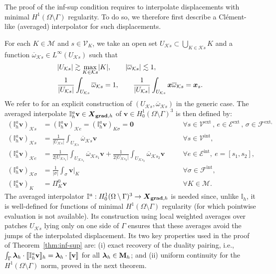 \documentclass[a4paper,11pt]{article}
\theoremstyle{definition}
\theoremstyle{remark}
\newcommand{\bvec}[1]{\boldsymbol{#1}}
\newcommand{\bo}[1]{\mathbf{#1}}
\newcommand{\bx}{\bvec{x}}
\def\ext{\text{ext}}
\def\inte{\text{int}}
\def\cE{\mathcal{E}}
\def\cF{\mathcal{F}}
\def\cK{\mathcal{K}}
\def\cM{\mathcal{M}}
\def\cV{\mathcal{V}}
\def\blambda{\boldsymbol{\lambda}}
\def\dgs{\boldsymbol{X}_{{\bf grad},h}}
\def\sjump#1{[\hskip -1.5pt[#1]\hskip -1.5pt]}
\def\O{\Omega}
\newcommand{\Ks}{{\mathcal{K}s}}
\newcommand{\Ke}{{\mathcal{K}e}}
\def\Ksig{{K\!\sigma}}
\begin{document}
The proof of the inf-sup condition requires to interpolate displacements with minimal ${H}^1(\Omega\setminus{\Gamma})$ regularity. To do so, we therefore first describe a Clément-like (averaged) interpolator for such displacements.

For each $K\in\cM$ and $s\in\cV_K$, we take an open set $U_{\cK s}\subset\bigcup_{K\in\cK s}K$ and a function $\overline{\omega}_{\cK s}\in L^\infty(U_{\cK s})$ such that 
\begin{align}
&\lvert U_{\cK s}\rvert \gtrsim \max\limits_{K\in\cK s}\lvert K\rvert,\qquad\lvert\overline{\omega}_{\cK s}\rvert\lesssim 1,\notag\\
&\frac{1}{\lvert U_{\cK s}\rvert}\int_{U_{\cK s}}\overline{\omega}_{\cK s}=1,\qquad\frac{1}{\lvert U_{\cK s}\rvert}\int_{U_{\cK s}}\bx\overline{\omega}_{\cK s}=\bx_s.\label{5.15b}
\end{align}
We refer to \cite[Appendix A]{jhr} for an explicit construction of $(U_{\cK s},\overline{\omega}_{\cK s})$ in the generic case.
The averaged interpolate $\mathbb I^{a}_h\bo{v}\in\dgs$ of $\bo{v}\in H^1_0(\O\setminus{\Gamma})^3$ is then defined by:
\begin{subequations}\label{3.44}
\begin{alignat}{2}
\left(\mathbb I^{a}_h\bo{v}\right)_{\Ks}&=\left(\mathbb I^{a}_h\bo{v}\right)_{\Ke}=\left(\mathbb I^{a}_h\bo{v}\right)_{\Ksig}=\bo{0}&&\quad\forall s\in \mathcal{V}^{\text{ext}}\,,\,e\in\cE^{\ext}\,,\,\sigma\in\cF^{\ext,} \nonumber\\
\left(\mathbb I^{a}_h\bo{v}\right)_{\Ks}&=\frac{1}{\lvert U_{\mathcal K s}\rvert}\int_{U_{\mathcal K s}}\overline{\omega}_{\mathcal Ks}\bo{v}&&\quad\forall s\in \cV^\inte,\nonumber\\
\left(\mathbb I^{a}_h\bo{v}\right)_{\Ke}&=\frac{1}{2\lvert U_{\mathcal K s_1}\rvert}\int_{U_{\mathcal K s_1}}\overline{\omega}_{\mathcal Ks_1}\bo{v}+\frac{1}{2\lvert U_{\mathcal K s_2}\rvert}\int_{U_{\mathcal K s_2}}\overline{\omega}_{\mathcal Ks_2}\bo{v}&&\quad\forall e\in\cE^\inte,~e=[s_1,s_2],\label{5.16c}\\
\left(\mathbb I^{a}_h\bo{v}\right)_{\cK\sigma}  &=\frac{1}{\lvert\sigma\rvert}\int_{\sigma}\bo{v}|_K &&\quad\forall \sigma\in\cF^\inte,\label{5.16d}\\
\left(\mathbb I^{a}_h\bo{v}\right)_K&=\Pi^0_K \bo{v}&&\quad\forall K\in\cM \nonumber.
\end{alignat}
\end{subequations}
The averaged interpolator $\mathbb I^{a} : H^1_0(\Omega \setminus \Gamma)^3 
\to \dgs$ is needed since, unlike $\mathbb{I}_{h}$, it is well-defined for  functions of minimal $H^1(\Omega \setminus \Gamma)$ regularity 
(for which pointwise evaluation is not available). Its construction using local weighted averages over patches $U_{\Ks}$ lying only on one side of $\Gamma$ ensures that these averages avoid the jumps of the interpolated displacement. Its two key properties used in the proof of Theorem~\ref{thm:inf-sup} 
are: (i) exact recovery of the duality pairing, i.e., $\int_\Gamma \blambda_h\cdot\sjump{\mathbb I^{a}_h\bo{v}}_h= \blambda_h \cdot \sjump{\bo{v}}$ for all $\blambda_h \in {\bf M}_{h}$;  and (ii) uniform continuity for the $H^1(\Omega\setminus\Gamma)$ norm, proved in the next theorem.
\end{document}
